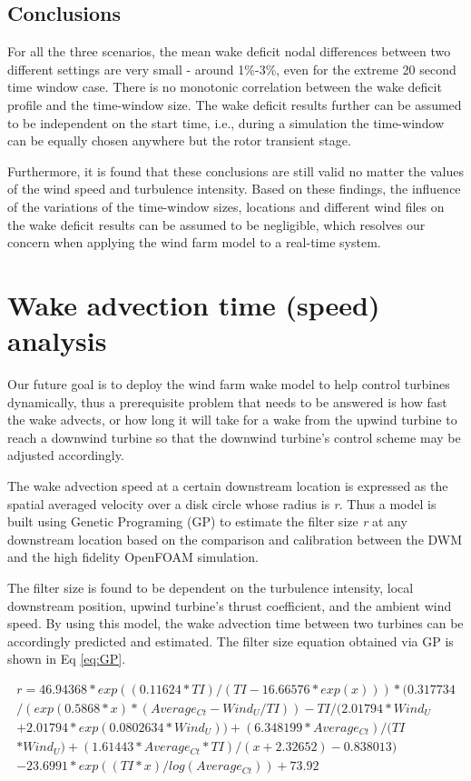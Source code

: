 \documentclass{umthesis}
\begin{document}
\subsection{Conclusions}
For all the three scenarios, the mean wake deficit nodal differences between two different settings are very small - around 1\%-3\%, even for the extreme 20 second time window case. There is no monotonic correlation between the wake deficit profile and the time-window size. The wake deficit results further can be assumed to be independent on the start time, i.e., during a simulation the time-window can be equally chosen anywhere but the rotor transient stage.

Furthermore, it is found that these conclusions are still valid no matter the values of the wind speed and turbulence intensity. Based on these findings, the influence of the variations of the time-window sizes, locations and different wind files on the wake deficit results can be assumed to be negligible, which resolves our concern when applying the wind farm model to a real-time system.

\section{Wake advection time (speed) analysis}\label{sec:DWM_advection_time}
Our future goal is to deploy the wind farm wake model to help control turbines dynamically, thus a prerequisite problem that needs to be answered is how fast the wake advects, or how long it will take for a wake from the upwind turbine to reach a downwind turbine so that the downwind turbine’s control scheme may be adjusted accordingly.

The wake advection speed at a certain downstream location is expressed as the spatial averaged velocity over a disk circle whose radius is \emph{r}. Thus a model is built using Genetic Programing (GP) to estimate the filter size \emph{r} at any downstream location based on the comparison and calibration between the DWM and the high fidelity OpenFOAM simulation.

The filter size is found to be dependent on the turbulence intensity, local downstream position, upwind turbine’s thrust coefficient, and the ambient wind speed. By using this model, the wake advection time between two turbines can be accordingly predicted and estimated. The filter size equation obtained via GP is shown in Eq \ref{eq:GP}.

\begin{equation}\label{eq:GP}
\begin{split}
r=46.94368*exp((0.11624*TI)/(TI-16.66576*exp(x)))*(0.317734 \\
/(exp(0.5868*x)*(Average_{Ct} - Wind_U/TI))- TI/(2.01794*Wind_U \\
+ 2.01794*exp(0.0802634*Wind_U)) + (6.348199*Average_{Ct})/(TI \\
*Wind_U) +(1.61443*Average_{Ct}*TI)/(x + 2.32652) - 0.838013) \\
 - 23.6991*exp((TI*x)/log(Average_{Ct})) + 73.92
\end{split}
\end{equation}
\end{document}
